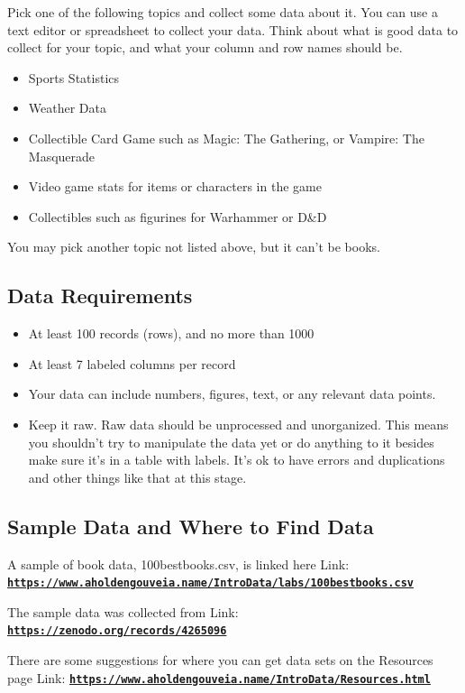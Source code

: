 \documentclass[12pt]{article}
\begin{document}
Pick one of the following topics and collect some data about it. You can use a text editor or spreadsheet to collect your data. Think about what is good data to collect for your topic, and what your column and row names should be.
\begin{itemize}
    \item Sports Statistics
    \item Weather Data
    \item Collectible Card Game such as Magic: The Gathering, or Vampire: The Masquerade
    \item Video game stats for items or characters in the game
    \item Collectibles such as figurines for Warhammer or D\&D
\end{itemize}
You may pick another topic not listed above, but it can't be books.

\subsection*{Data Requirements}
\begin{itemize}
    \item At least 100 records (rows), and no more than 1000
    \item At least 7 labeled columns per record
    \item Your data can include numbers, figures, text, or any relevant data points.
    \item Keep it raw. Raw data should be unprocessed and unorganized. This means you shouldn't try to manipulate the data yet or do anything to it besides make sure it's in a table with labels. It's ok to have errors and duplications and other things like that at this stage.
\end{itemize}

\subsection*{Sample Data and Where to Find Data}
A sample of book data, 100bestbooks.csv, is linked here Link: \href{https://www.aholdengouveia.name/IntroData/labs/100bestbooks.csv}{\textbf{\nolinkurl{https://www.aholdengouveia.name/IntroData/labs/100bestbooks.csv}}}

The sample data was collected from Link: \href{https://zenodo.org/records/4265096}{\textbf{\nolinkurl{https://zenodo.org/records/4265096}}}

There are some suggestions for where you can get data sets on the Resources page Link: \href{https://www.aholdengouveia.name/IntroData/Resources.html}{\textbf{\nolinkurl{https://www.aholdengouveia.name/IntroData/Resources.html}}}
\end{document}
